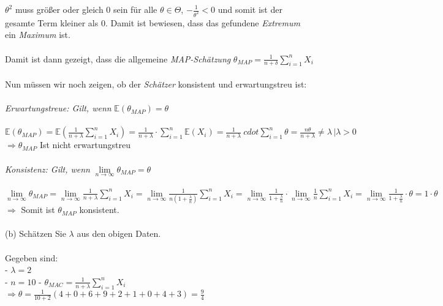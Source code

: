 \documentclass[a4paper]{article}
\begin{document}
$\theta^2$ muss größer oder gleich 0 sein für alle $\theta \in \Theta$, $- \frac{1}{\theta^2} < 0$ und somit ist der gesamte Term kleiner als 0. Damit ist bewiesen, dass das gefundene \textit{Extremum} ein \textit{Maximum} ist.\\\\
Damit ist dann gezeigt, dass die allgemeine \textit{MAP-Schätzung} $\theta_{MAP} = \frac{1}{n + \delta} \sum\limits_{i = 1}^n X_i$\\\\
Nun müssen wir noch zeigen, ob der \textit{Schätzer} konsistent und erwartungstreu ist:\\\\
\textit{Erwartungstreue: Gilt, wenn} $\mathbb{E}(\theta_{MAP}) = \theta$\\\\
$\mathbb{E}(\theta_{MAP}) = \mathbb{E}\left( \frac{1}{n + \lambda} \sum\limits_{i = 1}^n X_i \right) = \frac{1}{n + \lambda} \cdot \sum\limits_{i = 1}^n \mathbb{E}\left( X_i \right) = \frac{1}{n + \lambda} \ cdot \sum\limits_{i = 1}^n \theta = \frac{n \theta}{n + \lambda} \neq \lambda \, | \lambda > 0$\\
$\Rightarrow \theta_{MAP}$ Ist nicht erwartungstreu\\\\
\textit{Konsistenz: Gilt, wenn} $\lim\limits_{n \to \infty} \theta_{MAP} = \theta$\\\\
$\lim\limits_{n \to \infty} \theta_{MAP} = \lim\limits_{n \to \infty} \frac{1}{n + \lambda} \sum\limits_{i = 1}^n X_i = \lim\limits_{n \to \infty} \frac{1}{n(1 + \frac{\lambda}{n})} \sum\limits_{i = 1}^n X_i = \lim\limits_{n \to \infty} \frac{1}{1 + \frac{\lambda}{n}} \cdot \lim\limits_{n \to \infty} \frac{1}{n} \sum\limits_{i = 1}^n X_i = \lim\limits_{n \to \infty} \frac{1}{1 + \frac{\lambda}{n}} \cdot \theta = 1 \cdot \theta$\\
$\Rightarrow$ Somit ist $\theta_{MAP}$ konsistent.
\\\\
(b) Schätzen Sie $\lambda$ aus den obigen Daten.\\\\
Gegeben sind:\\
- $\lambda = 2$\\
- $n = 10$
- $\theta_{MAC} = \frac{1}{n + \lambda} \sum\limits_{i = 1}^n X_i$\\
$\Rightarrow \theta = \frac{1}{10 + 2} (4 + 0 + 6 + 9 + 2 + 1 + 0 + 4 + 3) = \frac{9}{4}$\\\\
\end{document}
